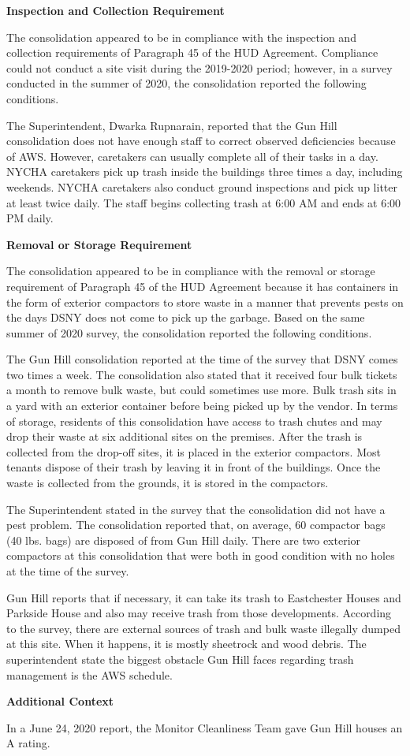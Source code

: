  

\textbf{Inspection and Collection Requirement} 

 

The consolidation appeared to be in compliance with the inspection and collection requirements of Paragraph 45 of the HUD Agreement. Compliance could not conduct a site visit during the 2019-2020 period; however, in a survey conducted in the summer of 2020, the consolidation reported the following conditions.

The Superintendent, Dwarka Rupnarain, reported that the Gun Hill consolidation does not have enough staff to correct observed deficiencies because of AWS. However, caretakers can usually complete all of their tasks in a day. NYCHA caretakers pick up trash inside the buildings three times a day, including weekends. NYCHA caretakers also conduct ground inspections and pick up litter at least twice daily. The staff begins collecting trash at 6:00 AM and ends at 6:00 PM daily. 

\textbf{Removal or Storage Requirement}

The consolidation appeared to be in compliance with the removal or storage requirement of Paragraph  45 of the HUD Agreement because it has containers in the form of exterior compactors to store waste in a manner that prevents pests on the days DSNY does not come to pick up the garbage. Based on the same summer of  2020 survey, the consolidation reported the following conditions. 

 

The Gun Hill consolidation reported at the time of the survey that DSNY comes two times a week. The consolidation also stated that it received four bulk tickets a month to remove bulk waste, but could sometimes use more. Bulk trash sits in a yard with an exterior container before being picked up by the vendor. In terms of storage, residents of this consolidation have access to trash chutes and may drop their waste at six additional sites on the premises. After the trash is collected from the drop-off sites, it is placed in the exterior compactors. Most tenants dispose of their trash by leaving it in front of the buildings. Once the waste is collected from the grounds, it is stored in the compactors.  

 

The Superintendent stated in the survey that the consolidation did not have a pest problem. The consolidation reported that, on average, 60 compactor bags (40 lbs. bags) are disposed of from Gun Hill daily. There are two exterior compactors at this consolidation that were both in good condition with no holes at the time of the survey. 

Gun Hill reports that if necessary, it can take its trash to Eastchester Houses and Parkside House and also may receive trash from those developments. According to the survey, there are external sources of trash and bulk waste illegally dumped at this site. When it happens, it is mostly sheetrock and wood debris.  The superintendent state the biggest obstacle Gun Hill faces regarding trash management is the AWS schedule. 

\textbf{Additional Context}  

In a June 24, 2020 report, the Monitor Cleanliness Team gave Gun Hill houses an A rating.  